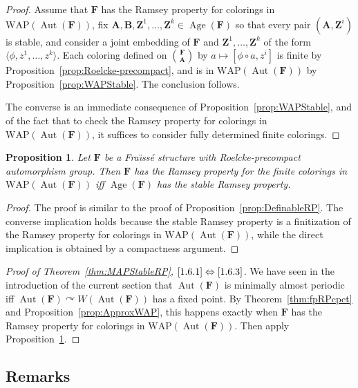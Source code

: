 \documentclass[11pt]{article}
\newtheorem{prop}[theo]{Proposition}
\theoremstyle{definition}
\numberwithin{equation}{section}
\numberwithin{figure}{section}
\numberwithin{table}{section}
\newcommand*{\mA}{\mathbf{A}}
\newcommand*{\mB}{\mathbf{B}}
\newcommand*{\mF}{\mathbf{F}}
\newcommand*{\mZ}{\mathbf{Z}}
\DeclareMathOperator{\Aut}{Aut}
\DeclareMathOperator{\Age}{Age}
\newcommand{\actson}{\curvearrowright}
\newcommand{\WAP}{\mathrm{WAP}}
\begin{document}
\begin{proof}
Assume that $\mF$ has the Ramsey property for colorings in $\WAP(\Aut(\mF))$, fix $\mA, \mB, \mZ^{1},\ldots,\mZ^{k}\in \Age(\mF)$ so that every pair $(\mA, \mZ^{i})$ is stable, and consider a joint embedding of $\mF$ and $\mZ^{1},\ldots,\mZ^{k}$ of the form $\langle \phi,z^{1},\ldots,z^{k}\rangle$. Each coloring defined on $\binom{\mF}{\mA}$ by $a\mapsto [\phi \circ a, z^{i}]$ is finite by Proposition~\ref{prop:Roelcke-precompact}, and is in $\WAP(\Aut(\mF))$ by Proposition~\ref{prop:WAPStable}. The conclusion follows.

The converse is an immediate consequence of Proposition~\ref{prop:WAPStable}, and of the fact that to check the Ramsey property for colorings in $\WAP(\Aut(\mF))$, it suffices to consider fully determined finite colorings.
\end{proof}

\begin{prop}\label{prop:RPWAPStableRP}
Let $\mF$ be a Fra\"{\i}ss\'e structure with Roelcke-precompact automorphism group. Then $\mF$ has the Ramsey property for the finite colorings in $\WAP(\Aut(\mF))$ iff $\Age(\mF)$ has the stable Ramsey property.
\end{prop}

\begin{proof}
The proof is similar to the proof of Proposition~\ref{prop:DefinableRP}. The converse implication holds because the stable Ramsey property is a finitization of the Ramsey property for colorings in $\WAP(\Aut(\mF))$, while the direct implication is obtained by a compactness argument.
\end{proof}

\begin{proof}[Proof of Theorem~\ref{thm:MAPStableRP}, $\eqref{1.6.1}\Leftrightarrow\eqref{1.6.3}$]
We have seen in the introduction of the current section that $\Aut(\mF)$ is minimally almost periodic iff $\Aut(\mF)\actson W(\Aut(\mF))$ has a fixed point. By Theorem~\ref{thm:fpRPcpct} and Proposition~\ref{prop:ApproxWAP}, this happens exactly when $\mF$ has the Ramsey property for colorings in $\WAP(\Aut(\mF))$. Then apply Propo\-sition~\ref{prop:RPWAPStableRP}.
\end{proof}

\subsection{Remarks}
\end{document}
